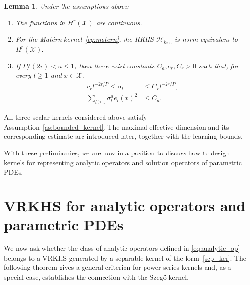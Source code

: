 \documentclass[11pt]{article}
\numberwithin{equation}{section}
\theoremstyle{plain}
\newtheorem{lemma}[theorem]{Lemma}
\theoremstyle{definition}
\theoremstyle{remark}
\newcommand{\X}{\mathcal{X}}
\newcommand{\Hs}{\mathcal{H}}
\begin{document}
\begin{lemma}
\label{lem:sob_char}
Under the assumptions above:

\begin{enumerate}[label=(\roman*)]
\item The functions in $H^r(\X)$ are continuous.

\item For the Matérn kernel~\eqref{eq:matern}, the RKHS
$\Hs_{k_{\mathrm{Sob}}}$ is norm-equivalent to $H^r(\X)$.

\item If $P/(2r)<a\leq1$, then there exist constants
$C_a,c_r,C_r>0$ such that, for every $l\geq1$ and $x\in\X$,
\begin{align}
c_r l^{-2r/P}
\leq \sigma_l
&\leq C_r l^{-2r/P},
\label{eq:evaules_decay}\\
\sum_{l\geq1}\sigma_l^a e_l(x)^2
&\leq C_a.
\label{eq:eigenfcts}
\end{align}
\end{enumerate}
\end{lemma}

All three scalar kernels considered above satisfy
Assumption~\ref{as:bounded_kernel}. The maximal effective dimension and its
corresponding estimate are introduced later, together with the learning
bounds.

With these preliminaries, we are now in a position to discuss how to design
kernels for representing analytic operators and solution operators of
parametric PDEs.

\section{\texorpdfstring{VRKHS for analytic operators and parametric PDEs}{VRKHS for analytic operators and parametric PDEs}}
\label{sec:vrkhs_analytic}

We now ask whether the class of analytic operators defined in
\eqref{eq:analytic_op} belongs to a VRKHS generated by a separable
kernel of the form~\eqref{sep_ker}. The following theorem gives a general
criterion for power-series kernels and, as a special case, establishes the
connection with the Szegö kernel.
\end{document}
